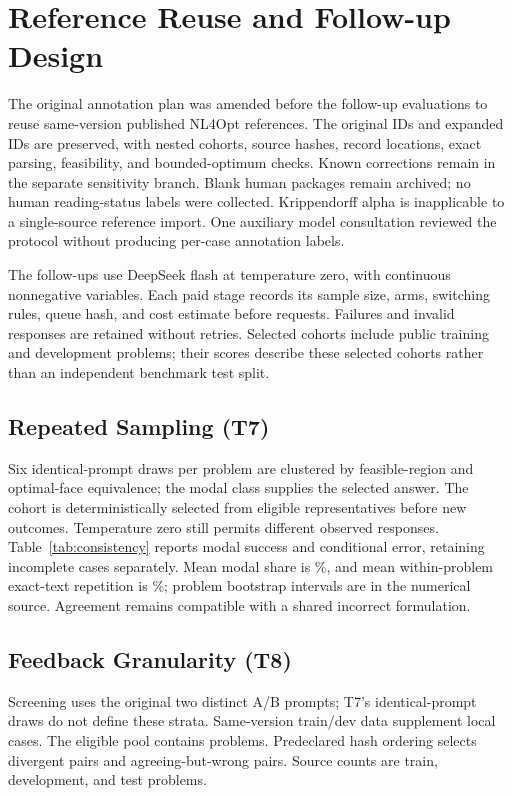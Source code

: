 \section{Reference Reuse and Follow-up Design}
The original annotation plan was amended before the follow-up evaluations to reuse same-version published NL4Opt references. The original \HeldoutN{} IDs and expanded \ReferenceN{} IDs are preserved, with nested cohorts, source hashes, record locations, exact parsing, feasibility, and bounded-optimum checks. Known corrections remain in the separate sensitivity branch. Blank human packages remain archived; no human reading-status labels were collected. Krippendorff alpha is inapplicable to a single-source reference import. One auxiliary model consultation reviewed the protocol without producing per-case annotation labels.

The follow-ups use DeepSeek flash at temperature zero, with continuous nonnegative variables. Each paid stage records its sample size, arms, switching rules, queue hash, and cost estimate before requests. Failures and invalid responses are retained without retries. Selected cohorts include public training and development problems; their scores describe these selected cohorts rather than an independent benchmark test split.

\subsection{Repeated Sampling (T7)}
Six identical-prompt draws per problem are clustered by feasible-region and optimal-face equivalence; the modal class supplies the selected answer. The cohort is deterministically selected from eligible representatives before new outcomes. Temperature zero still permits different observed responses. Table~\ref{tab:consistency} reports modal success and conditional error, retaining incomplete cases separately. Mean modal share is \ModalShare{}\%, and mean within-problem exact-text repetition is \TextRepeat{}\%; problem bootstrap intervals are in the numerical source. Agreement remains compatible with a shared incorrect formulation.

\subsection{Feedback Granularity (T8)}
Screening uses the original two distinct A/B prompts; T7's identical-prompt draws do not define these strata. Same-version train/dev data supplement local cases. The eligible pool contains \ScreenN{} problems. Predeclared hash ordering selects \DivergentN{} divergent pairs and \WrongAgreeN{} agreeing-but-wrong pairs. Source counts are \LadderTrain{} train, \LadderDev{} development, and \LadderTest{} test problems.


